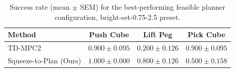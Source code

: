 \begin{table}[t]
\centering
\begin{tabular}{lccc}
\toprule
Method & Push Cube & Lift Peg & Pick Cube \\
\midrule
TD-MPC2 & $0.900 \pm 0.095$ & $0.200 \pm 0.126$ & $0.900 \pm 0.095$ \\
Squeeze-to-Plan (Ours) & $1.000 \pm 0.000$ & $0.800 \pm 0.126$ & $0.500 \pm 0.158$ \\
\bottomrule
\end{tabular}
\caption{Success rate (mean $\pm$ SEM) for the best-performing feasible planner configuration, bright-set-0.75-2.5 preset.}
\label{tab:latency_vs_success_rate_bright-set-0.75-2.5}
\end{table}
